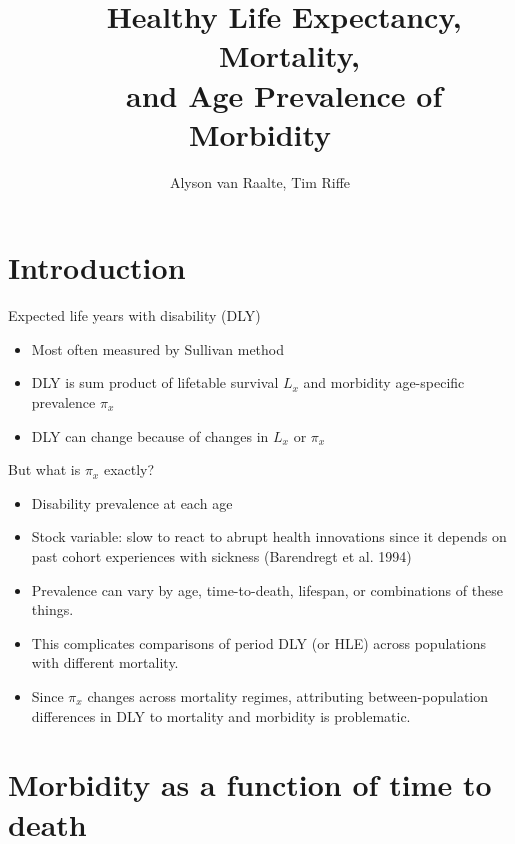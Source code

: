 \documentclass[20pt]{beamer}
\title[HLE, mortality and morbidity]{~~~Healthy Life Expectancy,\\~~~ Mortality,
\\~~~and Age Prevalence of Morbidity}
\subtitle{Alyson van Raalte, Tim Riffe}
\begin{document}

\begin{frame}
	\titlepage
\end{frame}

\section{Introduction}

\begin{frame}{Expected life years with disability (DLY)} 
\begin{itemize}[<+->]
\item Most often measured by Sullivan method
\item DLY is sum product of lifetable survival $L_x$ and morbidity age-specific
prevalence $\pi_x$
\item DLY can change because of changes in $L_x$ or $\pi_x$
\end{itemize}
\end{frame}
\begin{frame}{But what is $\pi_x$ exactly?}
\begin{itemize}[<+>]
\item Disability prevalence at each age
\item Stock variable: slow to react to abrupt health innovations since it depends on past cohort experiences with sickness (Barendregt et al. 1994)
\item Prevalence can vary by age, time-to-death, lifespan, or combinations of
these things.
\item This complicates comparisons of period DLY (or HLE) across
populations with different mortality.
\item Since $\pi_x$ changes across mortality regimes, attributing
between-population differences in DLY to mortality and morbidity is problematic.
\end{itemize}
\end{frame}


\section{Morbidity as a function of time to death}
\end{document}
